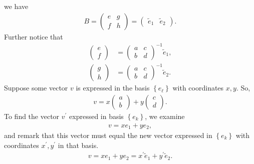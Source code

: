 \documentclass{report}
\begin{document}
\begin{itemize}
            we have
            \begin{align*}
                B = \begin{pmatrix} e & g \\f & h \end{pmatrix} = \begin{pmatrix} \tilde{e}_{1} & \tilde{e}_{2} \end{pmatrix}
            .\end{align*}
            Further notice that 
            \begin{align*}
                \begin{pmatrix} e \\ f \end{pmatrix} &= \begin{pmatrix} a & c \\ b & d \end{pmatrix}^{-1}\tilde{e}_{1}, \\
                \begin{pmatrix} g \\ h \end{pmatrix} &= \begin{pmatrix} a & c \\ b & d \end{pmatrix}^{-1}\tilde{e}_{2}
            .\end{align*}
            Suppose some vector $v$ is expressed in the basis $\left\{e_{\mathbf{\ell}}\right\}$ with coordinates $x,y$. So,
            \begin{align*}
                v = x\begin{pmatrix} a \\ b \end{pmatrix} + y \begin{pmatrix} c \\ d \end{pmatrix}
            .\end{align*}
            To find the vector $v^{\prime}$ expressed in basis $\left\{e_{k}\right\}$, we examine
            \begin{align*}
                v = xe_{1} + ye_{2}
            ,\end{align*}
            and remark that this vector must equal the new vector expressed in $\left\{e_{k}\right\}$ with coordinates $x^{\prime}, y^{\prime}$ in that basis.
            \begin{align*}
                v = xe_{1} + ye_{2} = x^{\prime} \tilde{e}_{1} + y^{\prime}\tilde{e}_{2}
            .\end{align*}

\end{itemize}
\end{document}
